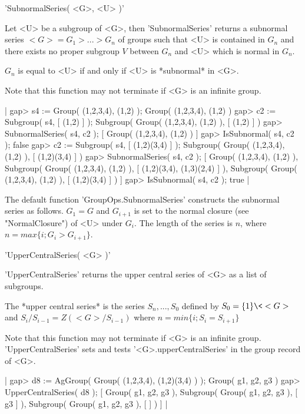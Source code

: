 
'SubnormalSeries( <G>, <U> )'

Let <U> be a subgroup of <G>, then 'SubnormalSeries' returns  a subnormal
series $<G> = G_1  > ... > G_n$ of  groups such that  <U> is contained in
$G_n$ and there exists no proper subgroup $V$ between $G_n$ and <U> which
is normal in $G_n$.

$G_n$ is equal to <U> if and only if <U> is *subnormal* in <G>.

Note that this function  may not terminate if  <G>  is an infinite group.

|    gap> s4 := Group( (1,2,3,4), (1,2) );
    Group( (1,2,3,4), (1,2) )
    gap> c2 := Subgroup( s4, [ (1,2) ] );
    Subgroup( Group( (1,2,3,4), (1,2) ), [ (1,2) ] )
    gap> SubnormalSeries( s4, c2 );
    [ Group( (1,2,3,4), (1,2) ) ]
    gap> IsSubnormal( s4, c2 );
    false
    gap> c2 := Subgroup( s4, [ (1,2)(3,4) ] );
    Subgroup( Group( (1,2,3,4), (1,2) ), [ (1,2)(3,4) ] )
    gap> SubnormalSeries( s4, c2 );
    [ Group( (1,2,3,4), (1,2) ), Subgroup( Group( (1,2,3,4), (1,2) ), 
        [ (1,2)(3,4), (1,3)(2,4) ] ),
      Subgroup( Group( (1,2,3,4), (1,2) ), [ (1,2)(3,4) ] ) ]
    gap> IsSubnormal( s4, c2 );
    true |

The default function 'GroupOps.SubnormalSeries' constructs  the subnormal
series as follows.  $G_1 = G$ and $G_{i+1}$ is  set to the normal closure
(see "NormalClosure") of <U> under  $G_i$.  The length of  the series  is
$n$, where $n = max\{i; G_i > G_{i+1}\}$.


'UpperCentralSeries( <G> )'

'UpperCentralSeries' returns the upper central series of <G> as a list of
subgroups.

The *upper central series* is the series $S_n,  ..., S_0$ defined by $S_0
= \{1\} \< <G>$ and $S_i/S_{i-1} = Z( <G>/S_{i-1} )$ where $n = min\{ i ;
S_i = S_{i+1} \}$

Note that this function may  not  terminate  if <G> is an infinite group.
'UpperCentralSeries' sets and tests '<G>.upperCentralSeries' in the group
record of <G>.

|    gap> d8 := AgGroup( Group( (1,2,3,4), (1,2)(3,4) ) );
    Group( g1, g2, g3 )
    gap> UpperCentralSeries( d8 );
    [ Group( g1, g2, g3 ), Subgroup( Group( g1, g2, g3 ), [ g3 ] ), 
      Subgroup( Group( g1, g2, g3 ), [  ] ) ] |

